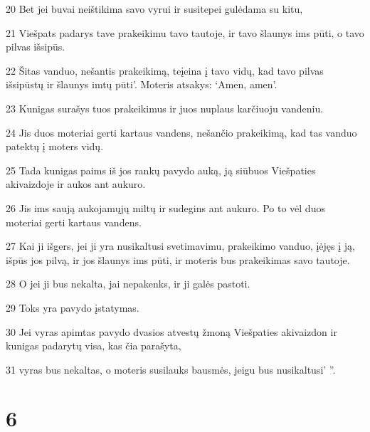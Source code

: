 \par 20 Bet jei buvai neištikima savo vyrui ir susitepei gulėdama su kitu, 
\par 21 Viešpats padarys tave prakeikimu tavo tautoje, ir tavo šlaunys ims pūti, o tavo pilvas išsipūs. 
\par 22 Šitas vanduo, nešantis prakeikimą, teįeina į tavo vidų, kad tavo pilvas išsipūstų ir šlaunys imtų pūti’. Moteris atsakys: ‘Amen, amen’. 
\par 23 Kunigas surašys tuos prakeikimus ir juos nuplaus karčiuoju vandeniu. 
\par 24 Jis duos moteriai gerti kartaus vandens, nešančio prakeikimą, kad tas vanduo patektų į moters vidų. 
\par 25 Tada kunigas paims iš jos rankų pavydo auką, ją siūbuos Viešpaties akivaizdoje ir aukos ant aukuro. 
\par 26 Jis ims saują aukojamųjų miltų ir sudegins ant aukuro. Po to vėl duos moteriai gerti kartaus vandens. 
\par 27 Kai ji išgers, jei ji yra nusikaltusi svetimavimu, prakeikimo vanduo, įėjęs į ją, išpūs jos pilvą, ir jos šlaunys ims pūti, ir moteris bus prakeikimas savo tautoje. 
\par 28 O jei ji bus nekalta, jai nepakenks, ir ji galės pastoti. 
\par 29 Toks yra pavydo įstatymas. 
\par 30 Jei vyras apimtas pavydo dvasios atvestų žmoną Viešpaties akivaizdon ir kunigas padarytų visa, kas čia parašyta, 
\par 31 vyras bus nekaltas, o moteris susilauks bausmės, jeigu bus nusikaltusi’ ”.



\chapter{6}

